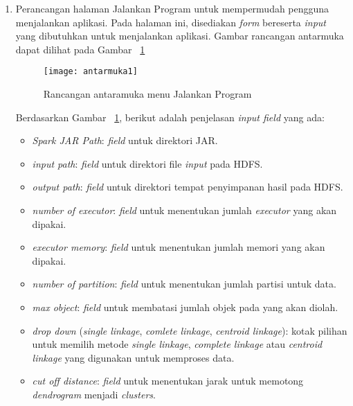 \begin{enumerate}

\item Perancangan halaman Jalankan Program untuk mempermudah pengguna menjalankan aplikasi. Pada halaman ini, disediakan \textit{form} bereserta \textit{input} yang dibutuhkan untuk menjalankan aplikasi. Gambar rancangan antarmuka dapat dilihat pada Gambar ~\ref{fig:antarmuka1}

\begin{figure}[H]
    \centering  
    \texttt{[image: antarmuka1]}  
    \caption[Rancangan antaramuka menu Jalankan Program]{Rancangan antaramuka menu Jalankan Program} 
    \label{fig:antarmuka1} 
\end{figure}

Berdasarkan Gambar ~\ref{fig:antarmuka1}, berikut adalah penjelasan \textit{input field} yang ada:

\begin{itemize}
\item \textit{Spark JAR Path}: \textit{field} untuk direktori JAR.

\item \textit{input path}: \textit{field} untuk direktori file \textit{input} pada HDFS.

\item \textit{output path}: \textit{field} untuk direktori tempat penyimpanan hasil pada HDFS.

\item \textit{number of executor}: \textit{field} untuk menentukan jumlah \textit{executor} yang akan dipakai.

\item \textit{executor memory}: \textit{field} untuk menentukan jumlah memori yang akan dipakai.

\item \textit{number of partition}: \textit{field} untuk menentukan jumlah partisi untuk data.

\item \textit{max object}: \textit{field} untuk membatasi jumlah objek pada yang akan diolah.

\item \textit{drop down} (\textit{single linkage}, \textit{comlete linkage}, \textit{centroid linkage}): kotak pilihan untuk memilih  metode \textit{single linkage}, \textit{complete linkage} atau \textit{centroid linkage} yang digunakan untuk memproses data.

\item \textit{cut off distance}: \textit{field} untuk menentukan jarak untuk memotong \textit{dendrogram} menjadi \textit{clusters}.


\end{itemize}
\end{enumerate}
